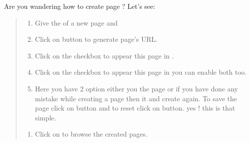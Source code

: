 \documentclass[a4paper,10pt,english]{report}
\begin{document}
Are you wandering how to create page ? Let’s see:
\begin{quote}
\begin{enumerate}
\def\theenumi{\alph{enumi}}
\def\labelenumi{\theenumi .}
\makeatletter\def\p@enumii{\p@enumi \theenumi .}\makeatother
\item {} 
Give the  of a new page and

\item {} 
Click on  button to generate page’s URL.

\item {} 
Click on the checkbox to appear this page in  .

\item {} 
Click on the checkbox to appear this page in  you can enable both too.

\item {} 
Here you have 2 option either you  the page or if you have done any mistake while creating a page then  it and create again. To save the page click on  button and to reset click on  button. yes ! this is that simple.

\end{enumerate}
\begin{enumerate}
\def\theenumi{\arabic{enumi}}
\def\labelenumi{\theenumi .}
\makeatletter\def\p@enumii{\p@enumi \theenumi .}\makeatother
\setcounter{enumi}{1}
\item {} 
Click on  to browse the created pages.

\end{enumerate}
\end{quote}

\begin{figure}[htbp]
\centering

\noindent{}
\end{figure}
\end{document}
